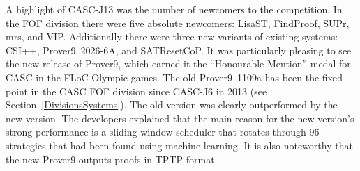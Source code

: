 \documentclass[aic]{iosart2x}
\newcommand{\THIS}{\mbox{CASC-J13}}
\begin{document}
A highlight of \THIS{} was the number of newcomers to the competition.
In the FOF division there were five absolute newcomers: LisaST, FindProof, SUPr, mrs, and VIP.
Additionally there were three new variants of existing systems: CSI++, Prover9~2026-6A, and
SATResetCoP.
It was particularly pleasing to see the new release of Prover9, which earned it the ``Honourable 
Mention'' medal for CASC in the FLoC Olympic games.
The old Prover9~1109a has been the fixed point in the CASC FOF division since CASC-J6 in 2013 
(see Section~\ref{DivisionsSystems}). 
The old version was clearly outperformed by the new version.
The developers explained that the main reason for the new version's strong performance is
a sliding window scheduler that rotates through 96 strategies that had been found using machine 
learning.
It is also noteworthy that the new Prover9 outputs proofs in TPTP format.
\end{document}
